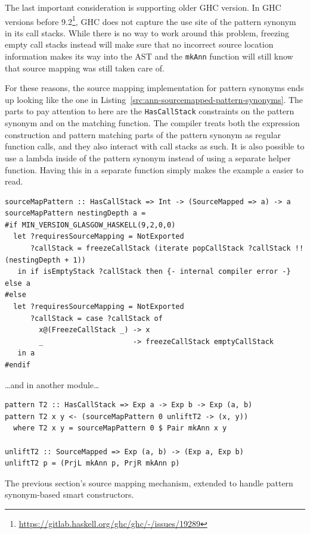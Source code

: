 \documentclass[fontsize=11pt,a4paper,parskip=half,numbers=noenddot]{scrartcl}
\newcommand{\hask}[1]{\texttt{#1}}
\begin{document}
The last important consideration is supporting older GHC version. In GHC
versions before
9.2\footnote{\url{https://gitlab.haskell.org/ghc/ghc/-/issues/19289}}, GHC does
not capture the use site of the pattern synonym in its call stacks. While there
is no way to work around this problem, freezing empty call stacks instead
will make sure that no incorrect source location information
makes its way into the AST and the \hask{mkAnn} function will still know that source
mapping was still taken care of.

For these reasons, the source mapping implementation for pattern synonyms ends
up looking like the one in Listing~\ref{src:ann-sourcemapped-pattern-synonyms}.
The parts to pay attention to here are the \hask{HasCallStack} constraints on
the pattern synonym and on the matching function. The compiler treats both the
expression construction and pattern matching parts of the pattern synonym as
regular function calls, and they also interact with call stacks as such. It is
also possible to use a lambda inside of the pattern synonym instead of using a
separate helper function. Having this in a separate function simply makes the
example a easier to read.

\begin{listing}[!th]
\begin{verbatim}
sourceMapPattern :: HasCallStack => Int -> (SourceMapped => a) -> a
sourceMapPattern nestingDepth a =
#if MIN_VERSION_GLASGOW_HASKELL(9,2,0,0)
  let ?requiresSourceMapping = NotExported
      ?callStack = freezeCallStack (iterate popCallStack ?callStack !! (nestingDepth + 1))
   in if isEmptyStack ?callStack then {- internal compiler error -} else a
#else
  let ?requiresSourceMapping = NotExported
      ?callStack = case ?callStack of
        x@(FreezeCallStack _) -> x
        _                     -> freezeCallStack emptyCallStack
   in a
#endif
\end{verbatim}

\dots{}and in another module\dots

\begin{verbatim}
pattern T2 :: HasCallStack => Exp a -> Exp b -> Exp (a, b)
pattern T2 x y <- (sourceMapPattern 0 unliftT2 -> (x, y))
  where T2 x y = sourceMapPattern 0 $ Pair mkAnn x y

unliftT2 :: SourceMapped => Exp (a, b) -> (Exp a, Exp b)
unliftT2 p = (PrjL mkAnn p, PrjR mkAnn p)
\end{verbatim}
\caption{The previous section's source mapping mechanism, extended to handle pattern synonym-based smart constructors.}\label{src:ann-sourcemapped-pattern-synonyms}
\end{listing}
\end{document}
